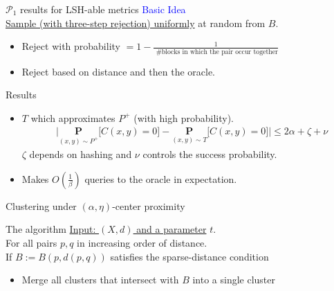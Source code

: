 \documentclass{beamer}
\newcommand{\mc}{\mathcal}
\newcommand{\mb}{\mathbf}
\begin{document}
\begin{frame}{$\mc P_1$ results for LSH-able metrics}
	\textcolor{blue}{Basic Idea}\\
	\hyperlink{RCCPositive}{Sample (with three-step rejection) uniformly} at random from $B$.
	\begin{itemize}
		\vspace{5pt}\item Reject with probability $= 1 - \frac{1}{\text{ \#blocks in which the pair occur together}}$
		\vspace{5pt}\item Reject based on distance and then the oracle.
	\end{itemize} 
	
	\begin{block}{Results}
		\begin{itemize}
			\item $T$ which approximates $P^+$ (with high probability).
			\begin{align*}
  &\Big|\underset{(x, y) \sim P^+}{\mb P} \big[ C(x, y) = 0 ] -\underset{(x, y) \sim T}{\mb P} \big[ C(x, y) = 0 ] \Big| \le 2\alpha + \zeta  + \nu
  			\end{align*} 
			$\zeta$ depends on hashing and $\nu$ controls the success probability. 
			\vspace{10pt}\item Makes $O(\frac{1}{\beta})$ queries to the oracle in expectation. 
		\end{itemize}			
	\end{block}
\end{frame}

\begin{frame}[label=detailsPositiveSparseNoise]{Clustering under $(\alpha, \eta)$-center proximity}
	\begin{block}{The algorithm}
	  \vspace{10pt}\hyperlink{positiveSparseNoise}{Input: $(X, d)$ and a parameter} $t$.\\

	  \vspace{20pt}For all pairs $p, q$ in increasing order of distance.\\
	  \vspace{10pt}If $B := B(p, d(p, q))$ satisfies the \alert{sparse-distance condition}
	  \begin{itemize}
	  	\vspace{5pt}\item Merge all clusters that intersect with $B$ into a single cluster
	  \end{itemize}
    \end{block}

\end{frame}
\end{document}
